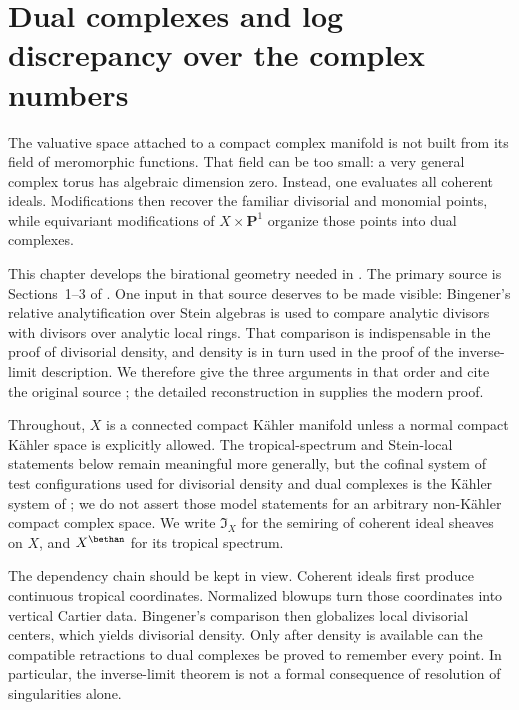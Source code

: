 \chapter{Dual complexes and log discrepancy over the complex numbers}
\label{chap:mp-dual-complexes}

The valuative space attached to a compact complex manifold is not built from
its field of meromorphic functions.  That field can be too small: a very
general complex torus has algebraic dimension zero.  Instead, one evaluates
all coherent ideals.  Modifications then recover the familiar divisorial and
monomial points, while equivariant modifications of
$X\times\mathbf P^1$ organize those points into dual complexes.

This chapter develops the birational geometry needed in
.  The primary source is
Sections~1--3 of \cite{MPTropicalV2}.  One input in that source deserves to be made
visible: Bingener's relative analytification over Stein algebras is used to
compare analytic divisors with divisors over analytic local rings.  That
comparison is indispensable in the proof of divisorial density, and density
is in turn used in the proof of the inverse-limit description.  We therefore
give the three arguments in that order and cite the original source
\cite{Bingener76Stein}; the detailed reconstruction in
\cite[Chapter~5]{XiaStein26} supplies the modern proof.

Throughout, $X$ is a connected compact K\"ahler manifold unless a normal
compact K\"ahler space is explicitly allowed.  The tropical-spectrum and
Stein-local statements below remain meaningful more generally, but the
cofinal system of test configurations used for divisorial density and dual
complexes is the K\"ahler system of \cite[Definition~2.5.1]{MPTropicalV2}; we do not
assert those model statements for an arbitrary non-K\"ahler compact complex
space.  We write $\mathfrak I_X$ for the semiring of coherent ideal sheaves
on $X$, and $X^{\bethan}$ for its tropical spectrum.

The dependency chain should be kept in view.  Coherent ideals first produce
continuous tropical coordinates.  Normalized blowups turn those coordinates
into vertical Cartier data.  Bingener's comparison then globalizes local
divisorial centers, which yields divisorial density.  Only after density is
available can the compatible retractions to dual complexes be proved to
remember every point.  In particular, the inverse-limit theorem is not a
formal consequence of resolution of singularities alone.

